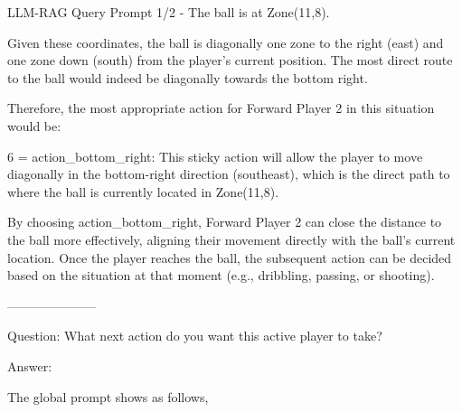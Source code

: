\begin{gbox}{LLM-RAG Query Prompt 1/2}
- The ball is at Zone(11,8).

\hspace{5mm}

Given these coordinates, the ball is diagonally one zone to the right 
(east) and one zone down (south) from the player's current position. 
The most direct route to the ball would indeed 
be diagonally towards the bottom right. 

\hspace{5mm}

Therefore, the most appropriate action for 
Forward Player 2 in this situation would be: 

\hspace{5mm}

6 = action\_bottom\_right: This sticky action will allow the player to
move diagonally in the bottom-right direction (southeast), 
which is the direct path to where the ball is currently located in Zone(11,8).



By choosing action\_bottom\_right, Forward Player 2 can close the distance to the ball more effectively, aligning their movement directly with the ball's current location. Once the player reaches the ball, the subsequent action can be decided based on the situation at that moment (e.g., dribbling, passing, or shooting).

\hspace{5mm}

---------------------
\hspace{5mm}

Question: What next action do you want this active player to take?  


Answer:       



\end{gbox}





The global prompt shows as follows,

